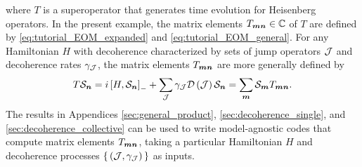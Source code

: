 where $T$ is a superoperator that generates time evolution for
Heisenberg operators.  In the present example, the matrix elements
$T_{\bm m\bm n}\in\mathbb{C}$ of $T$ are defined by
\eqref{eq:tutorial_EOM_expanded} and \eqref{eq:tutorial_EOM_general}.
For any Hamiltonian $H$ with decoherence characterized by sets of jump
operators $\mathcal{J}$ and decoherence rates $\gamma_{\mathcal{J}}$, the matrix elements
$T_{\bm m\bm n}$ are more generally defined by
\begin{align}
  T \mathcal{S}_{\bm n}
  = i\left[ H,\mathcal{S}_{\bm n} \right]_-
  + \sum_{\mathcal{J}} \gamma_{\mathcal{J}} \mathcal{D}\left( \mathcal{J} \right) \mathcal{S}_{\bm n}
  = \sum_{\bm m} \mathcal{S}_{\bm m} T_{\bm m\bm n}.
\end{align}
The results in Appendices \ref{sec:general_product},
\ref{sec:decoherence_single}, and \ref{sec:decoherence_collective} can
be used to write model-agnostic codes that compute matrix elements
$T_{\bm m\bm n}$, taking a particular Hamiltonian $H$ and decoherence
processes $\set{\left( \mathcal{J},\gamma_{\mathcal{J}}\right)}$ as inputs.

